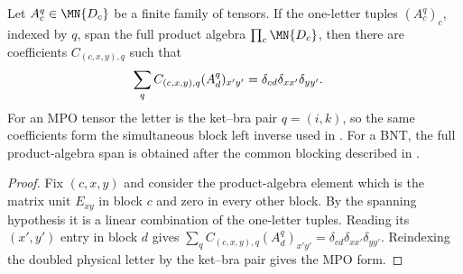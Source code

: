 \begin{lemma}%
    \label{thm:mpdo_one_letter_simultaneous_inverse}
    \leanok
    Let $A_c^q\in \MN{D_c}$ be a finite family of tensors. If
    the one-letter tuples $(A_c^q)_c$, indexed by $q$, span the full product
    algebra $\prod_c \MN{D_c}$, then there are coefficients
    $C_{(c,x,y),q}$ such that
    \begin{align}
        \sum_q C_{(c,x,y),q}(A_d^q)_{x'y'}
         & =\delta_{cd}\delta_{xx'}\delta_{yy'}.
        \notag
    \end{align}
    For an MPO tensor the letter is the ket--bra pair $q=(i,k)$, so the same
    coefficients form the simultaneous block left inverse used in
    \cite[lines~269--277]{Bultinck2017Anyons}. For a BNT, the full
    product-algebra span is obtained after the common blocking described in
    \cite[lines~427--431]{Bultinck2017Anyons}.
\end{lemma}

\begin{proof}\leanok
    Fix $(c,x,y)$ and consider the product-algebra element which is the matrix
    unit $E_{xy}$ in block $c$ and zero in every other block. By the spanning
    hypothesis it is a linear combination of the one-letter tuples. Reading
    its $(x',y')$ entry in block $d$ gives
    $\sum_q C_{(c,x,y),q}(A_d^q)_{x'y'}
        =\delta_{cd}\delta_{xx'}\delta_{yy'}$.
    Reindexing the doubled physical letter by the ket--bra pair gives the
    MPO form.
\end{proof}

